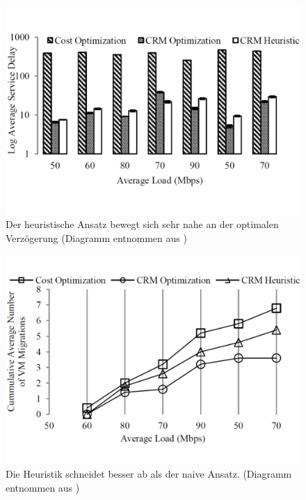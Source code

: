 \documentclass[conference]{IEEEtran}
\begin{document}
\begin{figure}[h]
	\centering
	\includegraphics[trim=0 3cm 0 1.5cm,scale=0.25]{grafik/delay.pdf}
	\caption{Der heuristische Ansatz bewegt sich sehr nahe an der optimalen Verzögerung
	(Diagramm entnommen aus \cite{IEEEhowto:orig})}
	\label{img:delay}
\end{figure}


\begin{figure}[h]
	\centering
	\includegraphics[trim=0 3cm 0 1.5cm,scale=0.25]{grafik/VMMIG.pdf}
	\caption{Die Heuristik schneidet besser ab als der naive Ansatz.
	(Diagramm entnommen aus \cite{IEEEhowto:orig})}
	\label{img:VMMIG}
\end{figure}
\end{document}
